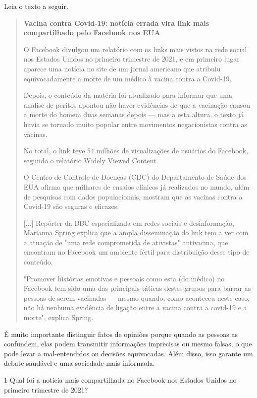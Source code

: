 Leia o texto a seguir.

\begin{quote}
\textbf{Vacina contra Covid-19: notícia errada vira link mais
compartilhado pelo Facebook nos EUA}

O Facebook divulgou um relatório com os links mais vistos na rede social
nos Estados Unidos no primeiro trimestre de 2021, e em primeiro lugar
aparece uma notícia no site de um jornal americano que atribuiu
equivocadamente a morte de um médico à vacina contra a Covid-19.

Depois, o conteúdo da matéria foi atualizado para informar que uma
análise de peritos apontou não haver evidências de que a vacinação
causou a morte do homem duas semanas depois --- mas a esta altura, o
texto já havia se tornado muito popular entre movimentos negacionistas
contra as vacinas.

No total, o link teve 54 milhões de visualizações de usuários do
Facebook, segundo o relatório Widely Viewed Content.

O Centro de Controle de Doenças (CDC) do Departamento de Saúde dos EUA
afirma que milhares de ensaios clínicos já realizados no mundo, além de
pesquisas com dados populacionais, mostram que as vacinas contra a
Covid-19 são seguras e eficazes.

{[}...{]} Repórter da BBC especializada em redes sociais e
desinformação, Marianna Spring explica que a ampla disseminação do link
tem a ver com a atuação de "uma rede comprometida de ativistas"
antivacina, que encontram no Facebook um ambiente fértil para
distribuição desse tipo de conteúdo.

"Promover histórias emotivas e pessoais como esta (do médico) no
Facebook tem sido uma das principais táticas destes grupos para barrar
as pessoas de serem vacinadas --- mesmo quando, como aconteceu neste
caso, não há nenhuma evidência de ligação entre a vacina contra a
covid-19 e a morte", explica Spring.

\end{quote}

É muito importante distinguir fatos de opiniões porque quando as pessoas
as confundem, elas podem transmitir informações imprecisas ou mesmo
falsas, o que pode levar a mal-entendidos ou decisões equivocadas. Além
disso, isso garante um debate saudável e uma sociedade mais informada.


\num{1} Qual foi a notícia mais compartilhada no Facebook nos Estados
Unidos no primeiro trimestre de 2021?

